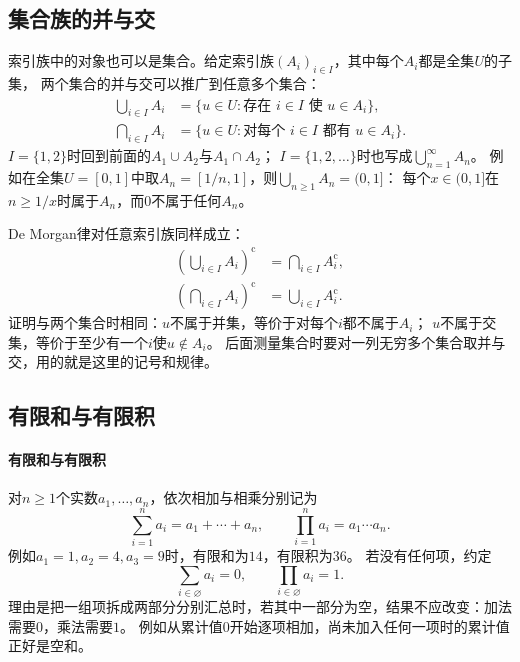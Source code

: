 \subsection{集合族的并与交}
\label{sec:prelim-indexed-set-operations}
索引族中的对象也可以是集合。给定索引族$(A_i)_{i\in I}$，其中每个$A_i$都是全集$U$的子集，
两个集合的并与交可以推广到任意多个集合：
\[
 \begin{aligned}
  \bigcup_{i\in I}A_i
  &=\{u\in U:\text{存在 }i\in I\text{ 使 }u\in A_i\},\\
  \bigcap_{i\in I}A_i
  &=\{u\in U:\text{对每个 }i\in I\text{ 都有 }u\in A_i\}.
 \end{aligned}
\]
$I=\{1,2\}$时回到前面的$A_1\cup A_2$与$A_1\cap A_2$；
$I=\{1,2,\ldots\}$时也写成$\bigcup_{n=1}^\infty A_n$。
例如在全集$U=[0,1]$中取$A_n=[1/n,1]$，则$\bigcup_{n\geq1}A_n=(0,1]$：
每个$x\in(0,1]$在$n\geq1/x$时属于$A_n$，而$0$不属于任何$A_n$。

De Morgan律对任意索引族同样成立：
\begin{equation}
 \begin{aligned}
  \left(\bigcup_{i\in I}A_i\right)^{\mathrm c}
  &=\bigcap_{i\in I}A_i^{\mathrm c},\\
  \left(\bigcap_{i\in I}A_i\right)^{\mathrm c}
  &=\bigcup_{i\in I}A_i^{\mathrm c}.
 \end{aligned}
 \label{eq:prelim-de-morgan-families}
\end{equation}
证明与两个集合时相同：$u$不属于并集，等价于对每个$i$都不属于$A_i$；
$u$不属于交集，等价于至少有一个$i$使$u\notin A_i$。
后面测量集合时要对一列无穷多个集合取并与交，用的就是这里的记号和规律。

\subsection{有限和与有限积}
\label{sec:prelim-finite-sums-products}

\paragraph{有限和与有限积}
对$n\geq1$个实数$a_1,\ldots,a_n$，依次相加与相乘分别记为
\[
  \sum_{i=1}^{n}a_i=a_1+\cdots+a_n,\qquad
  \prod_{i=1}^{n}a_i=a_1\cdots a_n.
\]
例如$a_1=1,a_2=4,a_3=9$时，有限和为$14$，有限积为$36$。
若没有任何项，约定
\[
  \sum_{i\in\varnothing}a_i=0,\qquad
  \prod_{i\in\varnothing}a_i=1.
\]
理由是把一组项拆成两部分分别汇总时，若其中一部分为空，结果不应改变：加法需要$0$，乘法需要$1$。
例如从累计值$0$开始逐项相加，尚未加入任何一项时的累计值正好是空和。

